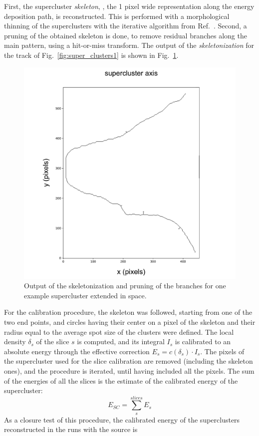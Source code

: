 First, the supercluster \textit{skeleton}, \ie, the 1 pixel wide
representation along the energy deposition path, is reconstructed.
This is performed with a morphological thinning of the superclusters
with the iterative algorithm from Ref.~\cite{thin1,thin2}.  Second, a
pruning of the obtained skeleton is done, to remove residual branches
along the main pattern, using a hit-or-miss transform.  The output of
the \textit{skeletonization} for the track of
Fig.~\ref{fig:super_clusters1} is shown in Fig.~\ref{fig:skeleton}.
%
\begin{figure}[ht]
  \begin{center}
     \includegraphics[width=0.49\linewidth]{figures/skeleton_paper}
     \caption{Output of the skeletonization and pruning of the
       branches for one example supercluster extended in
       space.  \label{fig:skeleton}}
  \end{center}
\end{figure}
%
For the calibration procedure, the skeleton was followed, starting
from one of the two end points, and circles having their center on a
pixel of the skeleton and their radius equal to the average spot size
of the \fe clusters were defined. The local density $\delta_s$ of the
slice $s$ is computed, and its integral $I_s$ is calibrated to an
absolute energy through the effective correction $E_s=c(\delta_s)\cdot
I_s$. The pixels of the supercluster used for the slice calibration
are removed (including the skeleton ones), and the procedure is
iterated, until having included all the pixels. The sum of the
energies of all the slices is the estimate of the calibrated energy of
the supercluster:
%
\begin{equation}
  \label{eq:ecal}
  E_{SC} = \sum_s^{slices} E_s
\end{equation}
%
As a closure test of this procedure, the calibrated energy of the
superclusters reconstructed in the runs with the \fe source is
